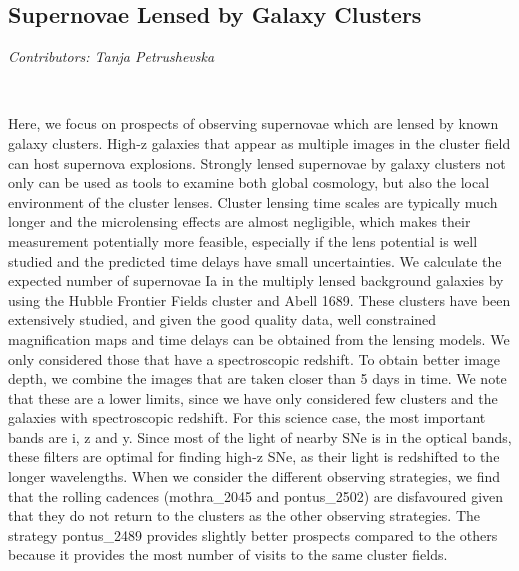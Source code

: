 \subsection{Supernovae Lensed by Galaxy Clusters}
\textit{Contributors: Tanja Petrushevska}

\

Here, we focus on prospects of observing supernovae which are
lensed by known galaxy clusters. High-z galaxies that appear as
multiple images in the cluster field can host supernova
explosions. Strongly lensed supernovae by galaxy clusters not only
can be used as tools to examine both global cosmology, but also
the local environment of the cluster lenses. Cluster lensing time
scales are typically much longer and the microlensing effects are
almost negligible, which makes their measurement potentially more
feasible, especially if the lens potential is well studied and the
predicted time delays have small uncertainties. We calculate the
expected number of supernovae Ia in the multiply lensed background
galaxies by using the Hubble Frontier Fields cluster and Abell
1689. These clusters have been extensively studied, and given the
good quality data, well constrained magnification maps and time
delays can be obtained from the lensing models. We only considered
those that have a spectroscopic redshift. To obtain better image
depth, we combine the images that are taken closer than 5 days in
time. We note that these are a lower limits, since we have only
considered few clusters and the galaxies with spectroscopic
redshift. For this science case, the most important bands are i, z
and y. Since most of the light of nearby SNe is in the optical
bands, these filters are optimal for finding high-z SNe, as their
light is redshifted to the longer wavelengths. When we consider
the different observing strategies, we find that the rolling
cadences (mothra\_2045 and pontus\_2502) are disfavoured given that
they do not return to the clusters as the other observing
strategies. The strategy pontus\_2489 provides slightly better
prospects compared to the others because it provides the most
number of visits to the same cluster fields.

